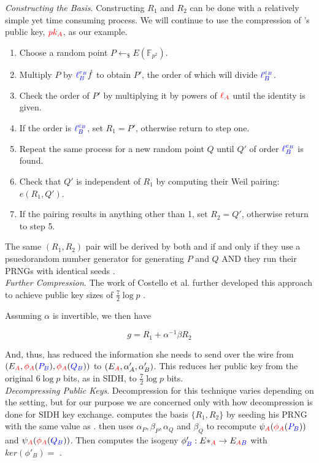 \noindent
\textit{Constructing the Basis}. Constructing $R_1$ and $R_2$ can be done with a relatively simple yet time consuming process. We will continue to use the compression of \alice's public key, $\textcolor{red}{pk_A}$, as our example.
\begin{enumerate}
\item Choose a random point $P \leftarrow_{\$} E(\mathbb{F}_{p^2})$.
\item Multiply $P$ by $\textcolor{blue}{\ell_{B}^{e_B}} \dot f$ to obtain $P'$, the order of which will divide $\textcolor{blue}{\ell_{B}^{e_B}}$.
\item Check the order of $P'$ by multiplying it by powers of $\textcolor{red}{\ell_{A}}$ until the identity is given.
\item If the order is $\textcolor{blue}{\ell_{B}^{e_B}}$, set $R_1 = P'$, otherwise return to step one.
\item Repeat the same process for a new random point $Q$ until $Q'$ of order $\textcolor{blue}{\ell_{B}^{e_B}}$ is found.
\item Check that $Q'$ is independent of $R_1$ by computing their Weil pairing: $e(R_1, Q')$.
\item If the pairing results in anything other than 1, set $R_2 = Q'$, otherwise return to step 5.
\end{enumerate}
The same $(R_1, R_2)$ pair will be derived by both \alice and \bob if and only if they use a psuedorandom number generator for generating $P$ and $Q$ AND they run their PRNGs with identical seeds \cite{pwcomp}.\\

\noindent
\textit{Further Compression}. The work of Costello et al. further developed this approach to achieve public key sizes of $\frac{7}{2}\log p$ \cite{pkcomp}. 

Assuming $\alpha$ is invertible, we then have

$$
g = R_1 + \alpha^{-1}\beta R_2
$$

And, thus, \alice has reduced the information she needs to send over the wire from $(E_{\textcolor{red}{A}}, \textcolor{red}{\phi_A}(\textcolor{blue}{P_B}), \textcolor{red}{\phi_A}(\textcolor{blue}{Q_B}))$ to $(E_{\textcolor{red}{A}}, \alpha'_{A}, \alpha'_{B})$. This reduces her public key from the original $6\log p$ bits, as in SIDH, to $\frac{7}{2}\log p$ bits.\\

\noindent
\textit{Decompressing Public Keys}. Decompression for this technique varies depending on the setting, but for our purpose we are concerned only with how decompression is done for SIDH key exchange. \bob computes the basis $\{R_1, R_2\}$ by seeding his PRNG with the same value as \alice. \bob then uses $\alpha_P, \beta_P, \alpha_Q$ and $\beta_Q$ to recompute $\psi_{\textcolor{red}{A}}(\textcolor{red}{\phi_A}(\textcolor{blue}{P_B}))$ and $\psi_{\textcolor{red}{A}}(\textcolor{red}{\phi_A}(\textcolor{blue}{Q_B}))$. Then \bob computes the isogeny $\phi'_{\textcolor{blue}{B}} : E*_{\textcolor{red}{A}} \rightarrow E_{\textcolor{red}{A}\textcolor{blue}{B}}$ with $ker(\phi'_{B}) =$ \cite{compwr}. 

